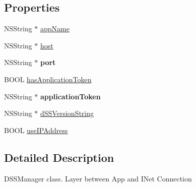 \subsection*{Properties}
\begin{DoxyCompactItemize}
\item 
N\-S\-String $\ast$ \hyperlink{interface_m_d_d_s_s_manager_a27147ce2bf5c9186c96503588983c047}{app\-Name}
\item 
N\-S\-String $\ast$ \hyperlink{interface_m_d_d_s_s_manager_a55aa29ea7dc235519473b2e4ea44c48c}{host}
\item 
\hypertarget{interface_m_d_d_s_s_manager_a2ff1c553be5c3e501021e1d13afdd634}{N\-S\-String $\ast$ {\bfseries port}}\label{interface_m_d_d_s_s_manager_a2ff1c553be5c3e501021e1d13afdd634}

\item 
B\-O\-O\-L \hyperlink{interface_m_d_d_s_s_manager_a25dada9b29593dcd220590d8fdabc58a}{has\-Application\-Token}
\item 
\hypertarget{interface_m_d_d_s_s_manager_a9c7d4d54ae3f3d0a182543929310549d}{N\-S\-String $\ast$ {\bfseries application\-Token}}\label{interface_m_d_d_s_s_manager_a9c7d4d54ae3f3d0a182543929310549d}

\item 
N\-S\-String $\ast$ \hyperlink{interface_m_d_d_s_s_manager_a49c80f7f7f2042658136095fe9f6928f}{d\-S\-S\-Version\-String}
\item 
B\-O\-O\-L \hyperlink{interface_m_d_d_s_s_manager_a4851a2746d573ed0bceddef07fd520f7}{use\-I\-P\-Address}
\end{DoxyCompactItemize}


\subsection{Detailed Description}
D\-S\-S\-Manager class. Layer between App and I\-Net Connection 

